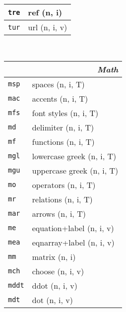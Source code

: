 \documentclass[oneside,10pt,landscape,DIV16]{scrartcl}
\newcommand{\Map}[1] {\textbf{\textasciiacute}\texttt{#1}}
\begin{document}
\begin{multicols}{3}
\begin{center}
\begin{tabular}[]{|p{11mm}|p{60mm}|}
\hline \Map{tre}  & ref                            \hfill (n, i)\\
\hline \Map{tur}  & url                            \hfill (n, i, v)\\
\hline
%
\end{tabular}\\
%
\begin{tabular}[]{|p{11mm}|p{62mm}|}
\hline
\multicolumn{2}{|r|}{\textsl{\textbf{M}ath}}  \\[1.0ex]
\hline  \Map{msp} & spaces                    \hfill (n, i, T)\\
\hline  \Map{mac} & accents                   \hfill (n, i, T)\\
\hline  \Map{mfs} & font styles               \hfill (n, i, T)\\
\hline  \Map{md}  & delimiter                 \hfill (n, i, T)\\
\hline  \Map{mf}  & functions                 \hfill (n, i, T)\\
\hline  \Map{mgl} & lowercase  greek          \hfill (n, i, T)\\
\hline  \Map{mgu} & uppercase greek           \hfill (n, i, T)\\
\hline  \Map{mo}  & operators                 \hfill (n, i, T)\\
\hline  \Map{mr}  & relations                 \hfill (n, i, T)\\
\hline  \Map{mar} & arrows                    \hfill (n, i, T)\\
\hline
\hline  \Map{me}  & equation+label            \hfill (n, i, v)\\
\hline  \Map{mea} & eqnarray+label            \hfill (n, i, v)\\
\hline  \Map{mm}  & matrix                    \hfill (n, i)\\
\hline
\hline  \Map{mch} & choose                    \hfill (n, i, v)\\
\hline  \Map{mddt}& ddot                      \hfill (n, i, v)\\
\hline  \Map{mdt} & dot                       \hfill (n, i, v)\\

\end{tabular}
\end{center}
\end{multicols}
\end{document}
